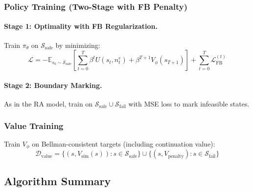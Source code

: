 \subsubsection{Policy Training (Two-Stage with FB Penalty)}

\paragraph{Stage 1: Optimality with FB Regularization.}
Train $\pi_\theta$ on $\mathcal{S}_{\text{safe}}$ by minimizing:
\begin{equation}
    \mathcal{L} = -\mathbb{E}_{s_0 \sim \mathcal{S}_{\text{safe}}} \left[ \sum_{t=0}^{T} \beta^t U(s_t, n_t^e) + \beta^{T+1} V_\phi(s_{T+1}) \right] + \sum_{t=0}^{T} \mathcal{L}_{\text{FB}}^{(t)}
\end{equation}

\paragraph{Stage 2: Boundary Marking.}
As in the RA model, train on $\mathcal{S}_{\text{safe}} \cup \mathcal{S}_{\text{fail}}$ with MSE loss to mark infeasible states.

\subsubsection{Value Training}
Train $V_\phi$ on Bellman-consistent targets (including continuation value):
\begin{equation}
    \mathcal{D}_{\text{value}} = \{(s, V_{\text{sim}}(s)) : s \in \mathcal{S}_{\text{safe}}\} \cup \{(s, V_{\text{penalty}}) : s \in \mathcal{S}_{\text{fail}}\}
\end{equation}


\subsection{Algorithm Summary}

